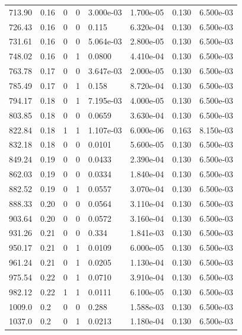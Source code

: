 \documentclass[preview]{standalone}
\begin{document}
{{{\begin{tabular}{L{1.2cm}C{1.2cm} C{0.3cm}C{0.5cm} C{1.4cm}C{1.4cm} C{1.4cm}C{1.4cm}}
  713.90  &  0.16  & 0     &  0 &  3.000e-03  & 1.700e-05  & 0.130 &  6.500e-03   \\ 
  726.43  &  0.16  & 0     &  0 &  0.115  & 6.320e-04  & 0.130 &  6.500e-03   \\ 
  731.61  &  0.16  & 0     &  0 &  5.064e-03  & 2.800e-05  & 0.130 &  6.500e-03   \\ 
  748.02  &  0.16  & 0     &  1 &  0.0800  & 4.410e-04  & 0.130 &  6.500e-03   \\ 
  763.78  &  0.17  & 0     &  0 &  3.647e-03  & 2.000e-05  & 0.130 &  6.500e-03   \\ 
  785.49  &  0.17  & 0     &  1 &  0.158  & 8.720e-04  & 0.130 &  6.500e-03   \\ 
  794.17  &  0.18  & 0     &  1 &  7.195e-03  & 4.000e-05  & 0.130 &  6.500e-03   \\ 
  803.85  &  0.18  & 0     &  0 &  0.0659  & 3.630e-04  & 0.130 &  6.500e-03   \\ 
  822.84  &  0.18  & 1     &  1 &  1.107e-03  & 6.000e-06  & 0.163 &  8.150e-03   \\ 
  832.18  &  0.18  & 0     &  0 &  0.0101  & 5.600e-05  & 0.130 &  6.500e-03   \\ 
  849.24  &  0.19  & 0     &  0 &  0.0433  & 2.390e-04  & 0.130 &  6.500e-03   \\ 
  862.03  &  0.19  & 0     &  0 &  0.0334  & 1.840e-04  & 0.130 &  6.500e-03   \\ 
  882.52  &  0.19  & 0     &  1 &  0.0557  & 3.070e-04  & 0.130 &  6.500e-03   \\ 
  888.33  &  0.20  & 0     &  0 &  0.0564  & 3.110e-04  & 0.130 &  6.500e-03   \\ 
  903.64  &  0.20  & 0     &  0 &  0.0572  & 3.160e-04  & 0.130 &  6.500e-03   \\ 
  931.26  &  0.21  & 0     &  0 &  0.334  & 1.841e-03  & 0.130 &  6.500e-03   \\ 
  950.17  &  0.21  & 0     &  1 &  0.0109  & 6.000e-05  & 0.130 &  6.500e-03   \\ 
  961.24  &  0.21  & 0     &  1 &  0.0205  & 1.130e-04  & 0.130 &  6.500e-03   \\ 
  975.54  &  0.22  & 0     &  1 &  0.0710  & 3.910e-04  & 0.130 &  6.500e-03   \\ 
  982.12  &  0.22  & 1     &  1 &  0.0111  & 6.100e-05  & 0.130 &  6.500e-03   \\ 
  1009.0  &   0.2  & 0     &  0 &  0.288  & 1.588e-03  & 0.130 &  6.500e-03   \\ 
  1037.0  &   0.2  & 0     &  1 &  0.0213  & 1.180e-04  & 0.130 &  6.500e-03   \\ 

\end{tabular}}}}
\end{document}
